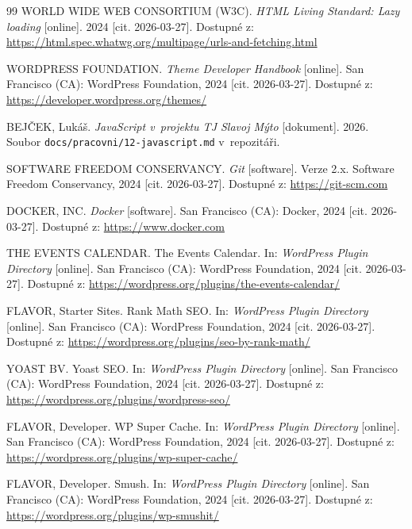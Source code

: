 \documentclass[12pt,a4paper]{article}
\begin{document}
\begin{thebibliography}{99}
WORLD WIDE WEB CONSORTIUM (W3C). \textit{HTML Living Standard: Lazy loading} [online]. 2024 [cit. 2026-03-27]. Dostupné z: \url{https://html.spec.whatwg.org/multipage/urls-and-fetching.html}

WORDPRESS FOUNDATION. \textit{Theme Developer Handbook} [online]. San Francisco (CA): WordPress Foundation, 2024 [cit. 2026-03-27]. Dostupné z: \url{https://developer.wordpress.org/themes/}

BEJČEK, Lukáš. \textit{JavaScript v~projektu TJ Slavoj Mýto} [dokument]. 2026. Soubor \texttt{docs/pracovni/12-javascript.md} v~repozitáři.

SOFTWARE FREEDOM CONSERVANCY. \textit{Git} [software]. Verze 2.x. Software Freedom Conservancy, 2024 [cit. 2026-03-27]. Dostupné z: \url{https://git-scm.com}

DOCKER, INC. \textit{Docker} [software]. San Francisco (CA): Docker, 2024 [cit. 2026-03-27]. Dostupné z: \url{https://www.docker.com}

THE EVENTS CALENDAR. The Events Calendar. In: \textit{WordPress Plugin Directory} [online]. San Francisco (CA): WordPress Foundation, 2024 [cit. 2026-03-27]. Dostupné z: \url{https://wordpress.org/plugins/the-events-calendar/}

FLAVOR, Starter Sites. Rank Math SEO. In: \textit{WordPress Plugin Directory} [online]. San Francisco (CA): WordPress Foundation, 2024 [cit. 2026-03-27]. Dostupné z: \url{https://wordpress.org/plugins/seo-by-rank-math/}

YOAST BV. Yoast SEO. In: \textit{WordPress Plugin Directory} [online]. San Francisco (CA): WordPress Foundation, 2024 [cit. 2026-03-27]. Dostupné z: \url{https://wordpress.org/plugins/wordpress-seo/}

FLAVOR, Developer. WP Super Cache. In: \textit{WordPress Plugin Directory} [online]. San Francisco (CA): WordPress Foundation, 2024 [cit. 2026-03-27]. Dostupné z: \url{https://wordpress.org/plugins/wp-super-cache/}

FLAVOR, Developer. Smush. In: \textit{WordPress Plugin Directory} [online]. San Francisco (CA): WordPress Foundation, 2024 [cit. 2026-03-27]. Dostupné z: \url{https://wordpress.org/plugins/wp-smushit/}

\end{thebibliography}

\end{document}
